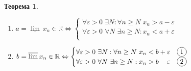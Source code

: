 \documentclass[12pt,letterpaper]{report}
\newtheorem*{theorem-non}{Теорема}
\theoremstyle{definition}
\newcommand*\circled[1]{\tikz[baseline=(char.base)]{
            \node[shape=circle,draw,inner sep=2pt] (char) {#1};}}
\begin{document}
    \begin{theorem-non}\end{theorem-non}
    \begin{enumerate}
        \item $a = \underline{\lim}\, x_n \in \mathbb{R} \Leftrightarrow
        \begin{cases}
            \forall \varepsilon > 0 \,\, \exists N : \forall n \geq N
            \,\, x_n > a - \varepsilon\\
            \forall \varepsilon > 0 \,\, \forall N \,\, \exists n \geq N
            : x_n < a + \varepsilon\\
        \end{cases}$
        \item $b = \overline{\lim}\, x_n \in \mathbb{R} \Leftrightarrow
        \begin{cases}
            \forall \varepsilon > 0 \,\, \exists N : \forall n \geq N
            \,\, x_n < b + \varepsilon \quad \circled{1}\\
            \forall \varepsilon > 0 \,\, \forall N \,\, \exists n \geq N
            : x_n > b - \varepsilon \quad \circled{2}\\
        \end{cases}$
    \end{enumerate}
\end{document}
